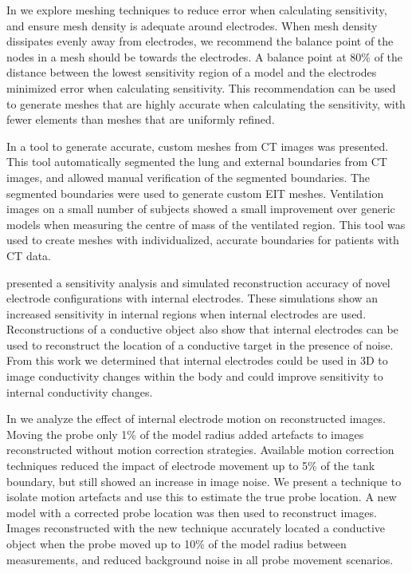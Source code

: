
In  we explore meshing techniques to reduce error when calculating sensitivity, and ensure mesh density is adequate 
around electrodes. 
When mesh density dissipates evenly away from electrodes, we recommend 
the balance point 
of the nodes in a mesh should be towards the electrodes. 
A balance point
at 80\% of the distance between the lowest sensitivity region of a 
model and the electrodes minimized error when calculating sensitivity. 
This recommendation can be used to generate 
meshes that are highly accurate when calculating the sensitivity, with fewer elements
than meshes that are uniformly refined.  

In  a tool to generate accurate, custom meshes from 
CT images was presented. This tool automatically segmented the lung and external 
boundaries from CT images, and allowed manual verification of the segmented boundaries. 
The segmented boundaries were used to generate custom EIT meshes. 
Ventilation images on a small number of subjects 
showed a small improvement over generic models when 
measuring the centre of mass of the ventilated region. This tool 
was used to create meshes with individualized, accurate boundaries 
for patients with CT data.

 presented a sensitivity analysis and simulated 
reconstruction accuracy of novel electrode configurations with internal electrodes. 
These simulations show an increased sensitivity in internal regions when internal electrodes are used. Reconstructions 
of a conductive object also show that internal electrodes can be used to reconstruct 
the location of a conductive target in the presence of noise. From this work 
we determined that internal electrodes could be used in 3D to image conductivity changes 
within the body and could improve sensitivity to internal conductivity changes. 

In  we analyze the effect of internal electrode motion on reconstructed 
images. Moving the probe only 1\% of the model radius added artefacts
to images reconstructed without motion correction strategies. 
Available motion correction techniques reduced the impact of 
electrode movement up to 5\% of the tank boundary, but still showed an increase in 
image noise. 
We present a technique to isolate motion artefacts and use this to 
estimate the true probe location. A new model with a corrected probe location 
was then used to reconstruct images. Images reconstructed with the new technique
accurately located a conductive object when the probe moved up to 
10\% of the model radius between measurements, 
and reduced background noise in all probe movement scenarios. 

